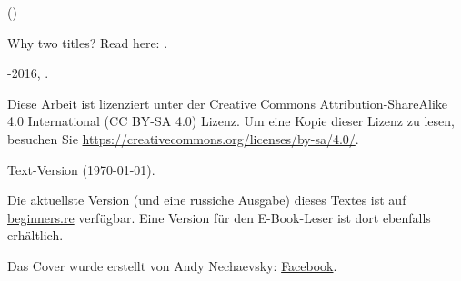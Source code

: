 \begin{titlepage}


\end{titlepage}

\newpage

\begin{center}
\vspace*{\fill}
{\LARGE \TitleMain}

\bigskip

{\large (\TitleAux)}

\bigskip
\bigskip
Why two titles? Read here: . %

\vspace*{\fill}

{\large \AUTHOR}

{\large \TT{<\EMAIL>}}
\vspace*{\fill}
\vfill

\ccbysa

-2016, \AUTHOR. 

Diese Arbeit ist lizenziert unter der Creative Commons Attribution-ShareAlike 4.0 International (CC BY-SA 4.0) Lizenz.
Um eine Kopie dieser Lizenz zu lesen, besuchen Sie \url{https://creativecommons.org/licenses/by-sa/4.0/}.

Text-Version ({\large \today}).

Die aktuellste Version (und eine russiche Ausgabe) dieses Textes ist auf \href{http://go.yurichev.com/17009}{beginners.re} verfügbar.
Eine Version für den E-Book-Leser ist dort ebenfalls erhältlich.

Das Cover wurde erstellt von Andy Nechaevsky: \href{http://go.yurichev.com/17023}{Facebook}.

\end{center}
